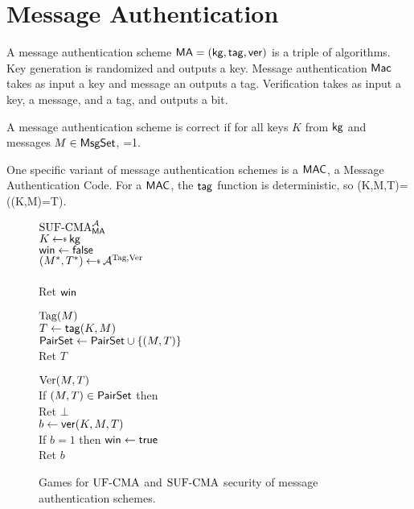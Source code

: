 \section{Message Authentication}
\label{sec:msgauth}

A message authentication scheme $\mathsf{MA} = ({\sf kg},\mathsf{tag},\mathsf{ver})$ is a triple of
algorithms. Key generation is randomized and outputs a key. Message
authentication ${\sf Mac}$ takes as input a key and message an outputs a tag.
Verification takes as input a key, a message, and a tag, and outputs a bit. 

A message authentication scheme is correct if for all keys $K$ from ${\sf kg}$ and messages $M\in \textsf{MsgSet}$, 
\bnm
{}=1\;.
\enm

One specific variant of message authentication schemes is a $\mbox{\textsf{MAC}}$, a Message Authentication Code. For a $\mathsf{MAC}$, the $\mathsf{tag}$ function is deterministic, so 
\bnm
\ver(K,M,T)=(\mtag(K,M)=T)\;.
\enm
\begin{figure}[t]
	\centering
	{
	\underline{$\textnormal{SUF-CMA}_{\mathsf{MA}}^{\mathcal A}$}\\[1pt]
	$K \getsr \kg$\\
	$\mathsf{win}\gets\mathsf{false}$\\
	$(M^*,T^*) \getsr \advA^{\TagOracle,\VerOracle}$\\
	\\
	Ret $\mathsf{win}$\medskip
	}{
	\underline{$\textnormal{Tag}(M)$}\\
	$T \gets \mathsf{tag}(K,M)$\\
	$\textsf{PairSet} \gets \textsf{PairSet} \cup \{(M,T)\}$\\
	Ret $T$\medskip 
	
	\underline{$\textnormal{Ver}(M,T)$}\\
	If $(M,T) \in \textsf{PairSet}$ then \\
	\myInd Ret $\bot$\\
	$b \gets \mathsf{ver}(K,M,T)$\\
	If $b = 1$ then $\mathsf{win}\gets\mathsf{true}$\\
	Ret $b$
	}	
	\caption{Games for $\textnormal{UF-CMA}$ and $\textnormal{SUF-CMA}$ security of message authentication schemes.}
	\label{fig:game-ufcma}
\end{figure}

